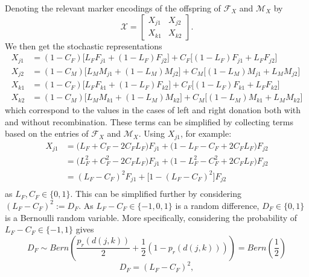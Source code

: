 \documentclass{article}
\begin{document}
Denoting the relevant marker encodings of the offspring of $\mathcal{F}_X$ and $\mathcal{M}_X$ by
\begin{equation} \label{eq:randomOff}
  \mathcal{X} = \begin{bmatrix}
    X_{j1} & X_{j2} \\
    X_{k1} & X_{k2}
  \end{bmatrix}.
\end{equation}
We then get the stochastic representations
\begin{align*}
  X_{j1} & =  (1 - C_F)\Big [L_F F_{j1} + (1 - L_F) F_{j2} \Big ] + C_F \Big [ (1 - L_F) F_{j1} + L_F F_{j2} \Big ] \\
  X_{j2} & =  (1 - C_M)\Big [L_M M_{j1} + (1 - L_M) M_{j2} \Big ] + C_M \Big [ (1 - L_M) M_{j1} + L_M M_{j2} \Big ] \\
  X_{k1} & =  (1 - C_F)\Big [L_F F_{k1} + (1 - L_F) F_{k2} \Big ] + C_F \Big [ (1 - L_F) F_{k1} + L_F F_{k2} \Big ] \\
  X_{k2} & =  (1 - C_M)\Big [L_M M_{k1} + (1 - L_M) M_{k2} \Big ] + C_M \Big [ (1 - L_M) M_{k1} + L_M M_{k2} \Big ] 
\end{align*}
which correspond to the values in the cases of left and right donation both with and without recombination. These terms can be simplified by collecting terms based on the entries of $\mathcal{F}_X$ and $\mathcal{M}_X$. Using $X_{j1}$, for example:
\begin{align*}
  X_{j1} & = \Big ( L_F + C_F - 2 C_F L_F \Big ) F_{j1} + \Big ( 1 - L_F - C_F + 2 C_F L_F \Big ) F_{j2} \\
         & = \Big ( L_F^2 + C_F^2 - 2 C_F L_F \Big ) F_{j1} + \Big ( 1 - L_F^2 - C_F^2 + 2 C_F L_F \Big ) F_{j2} \\
  & = ( L_F - C_F )^2 F_{j1} + \Big [ 1 - ( L_F - C_F )^2 \Big ] F_{j2} \\
\end{align*}
as $L_F, C_F \in \{0,1\}$. This can be simplified further by considering $(L_F - C_F)^2 := D_F$. As $L_F - C_F \in \{-1,0,1\}$ is a random difference, $D_F \in \{0, 1\}$ is a Bernoulli random variable. More specifically, considering the probability of $L_F - C_F \in \{-1, 1\}$ gives
$$D_F \sim Bern \left( \frac{p_r(d(j,k))}{2} + \frac{1}{2}( 1 - p_r(d(j,k)) ) \right ) = Bern \left ( \frac{1}{2} \right )$$
\begin{equation} \label{eq:differenceCL}
  D_F = (L_F - C_F)^2,
\end{equation}




\renewcommand*{\bibname}{References} %

\end{document}
